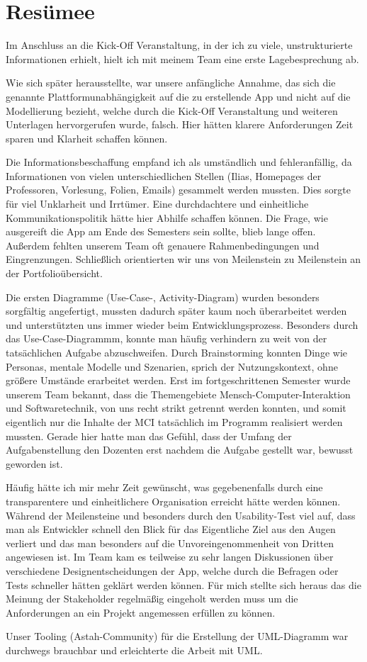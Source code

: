 \chapter{Resümee}

Im Anschluss an die Kick-Off Veranstaltung, in der ich zu viele,
unstrukturierte Informationen erhielt, hielt ich mit meinem Team eine
erste Lagebesprechung ab.

Wie sich später herausstellte, war unsere anfängliche Annahme, das sich die
genannte Plattformunabhängigkeit auf die zu erstellende App und nicht auf die
Modellierung bezieht, welche durch die Kick-Off Veranstaltung und weiteren
Unterlagen hervorgerufen wurde, falsch. Hier hätten klarere Anforderungen Zeit
sparen und Klarheit schaffen können.

Die Informationsbeschaffung empfand ich als umständlich und fehleranfällig, da
Informationen von vielen unterschiedlichen Stellen (Ilias, Homepages der
Professoren, Vorlesung, Folien, Emails) gesammelt werden mussten. Dies sorgte
für viel Unklarheit und Irrtümer. Eine durchdachtere und einheitliche
Kommunikationspolitik hätte hier Abhilfe schaffen können. Die Frage, wie
ausgereift die App am Ende des Semesters sein sollte, blieb lange offen.
Außerdem fehlten unserem Team oft genauere Rahmenbedingungen und Eingrenzungen.
Schließlich orientierten wir uns von Meilenstein zu Meilenstein an der
Portfolioübersicht.

Die ersten Diagramme (Use-Case-, Activity-Diagram) wurden besonders sorgfältig
angefertigt, mussten dadurch später kaum noch überarbeitet werden und
unterstützten uns immer wieder beim Entwicklungsprozess. Besonders durch das
Use-Case-Diagrammm, konnte man häufig verhindern zu weit von der tatsächlichen
Aufgabe abzuschweifen. Durch Brainstorming konnten Dinge wie Personas, mentale
Modelle und Szenarien, sprich der Nutzungskontext, ohne größere Umstände
erarbeitet werden. Erst im fortgeschrittenen Semester wurde unserem Team
bekannt, dass die Themengebiete Mensch-Computer-Interaktion und Softwaretechnik,
von uns recht strikt getrennt werden konnten, und somit eigentlich nur die
Inhalte der MCI tatsächlich im Programm realisiert werden mussten. Gerade hier
hatte man das Gefühl, dass der Umfang der Aufgabenstellung den Dozenten erst
nachdem die Aufgabe gestellt war, bewusst geworden ist.

Häufig hätte ich mir mehr Zeit gewünscht, was gegebenenfalls durch eine
transparentere und einheitlichere Organisation erreicht hätte werden können.
Während der Meilensteine und besonders durch den Usability-Test viel auf, dass
man als Entwickler schnell den Blick für das Eigentliche Ziel aus den Augen
verliert und das man besonders auf die Unvoreingenommenheit von Dritten
angewiesen ist. Im Team kam es teilweise zu sehr langen Diskussionen über
verschiedene Designentscheidungen der App, welche durch die Befragen oder Tests
schneller hätten geklärt werden können. Für mich stellte sich heraus das die
Meinung der Stakeholder regelmäßig eingeholt werden muss um die Anforderungen an
ein Projekt angemessen erfüllen zu können.

Unser Tooling (Astah-Community) für die Erstellung der UML-Diagramm war
durchwegs brauchbar und erleichterte die Arbeit mit UML.